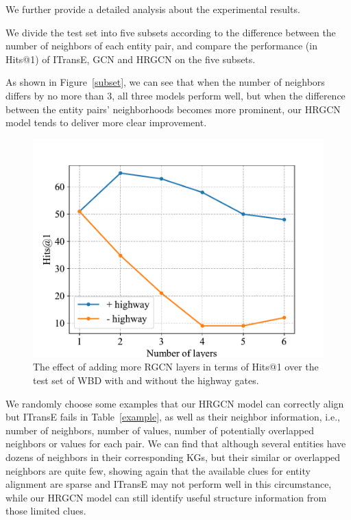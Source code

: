 	We further provide a detailed analysis about the experimental results.
	
	We divide the test set into five subsets according to the difference between the number of neighbors of each entity pair, and compare the performance (in Hits@1) of ITransE, GCN and HRGCN on the five subsets.
	
	As shown in Figure~\ref{subset}, we can see that when the number of neighbors differs by no more than 3, all three models perform well,
	but when the difference between the entity pairs' neighborhoods becomes more prominent,
	our HRGCN model tends to deliver more clear improvement.

	\begin{figure}
		\begin{center}
			\includegraphics[width=1\linewidth]{figures/graph3.pdf}
			\caption{The effect of adding more RGCN layers in terms of Hits@1 over the test set of WBD with and without the highway gates.}
			\label{highway}
		\end{center}
	\end{figure}
	We randomly choose some examples that our HRGCN model can correctly align but ITransE fails in Table~\ref{example}, as well as their neighbor information, i.e., number of neighbors, number of values, number of potentially overlapped neighbors or values for each pair.
	We can find that although several entities have dozens of neighbors in their corresponding KGs, but their similar or overlapped neighbors are quite few, showing again that
	the available clues for entity alignment are sparse and ITransE may not perform well in this circumstance, while our HRGCN model can still identify useful structure information from those limited clues.
	
